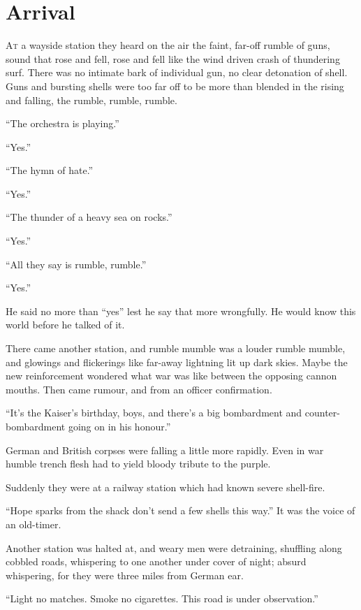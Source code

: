 \chapter*{\textsf{Arrival}}

A\textsc{t} a wayside station they heard on the air the faint, far-off 
rumble of guns, sound that rose and fell, rose and fell like the wind driven 
crash of thundering surf. There was no intimate bark of individual gun, no 
clear detonation of shell. Guns and bursting shells were too far off to be 
more than blended in the rising and falling, the rumble, rumble, rumble.

``The orchestra is playing.''

``Yes.''

``The hymn of hate.''

``Yes.''

``The thunder of a heavy sea on rocks.''

``Yes.''

``All they say is rumble, rumble.''

``Yes.''

He said no more than ``yes'' lest he say that more wrongfully. He would know 
this world before he talked of it.

There came another station, and rumble mumble was a louder rumble mumble, and 
glowings and flickerings like far-away lightning lit up dark skies. Maybe the 
new reinforcement wondered what war was like between the opposing cannon mouths. 
Then came rumour, and from an officer confirmation.

``It's the Kaiser's birthday, boys, and there's a big bombardment and 
counter-bombardment going on in his honour.''

German and British corpses were falling a little more rapidly. Even in war humble 
trench flesh had to yield bloody tribute to the purple.

Suddenly they were at a railway station which had known severe shell-fire.

``Hope sparks from the shack don't send a few shells this way.'' It was the voice of 
an old-timer.

Another station was halted at, and weary men were detraining, shuffling along cobbled 
roads, whispering to one another under cover of night; absurd whispering, for they were 
three miles from German ear.

``Light no matches. Smoke no cigarettes. This road is under observation.''


